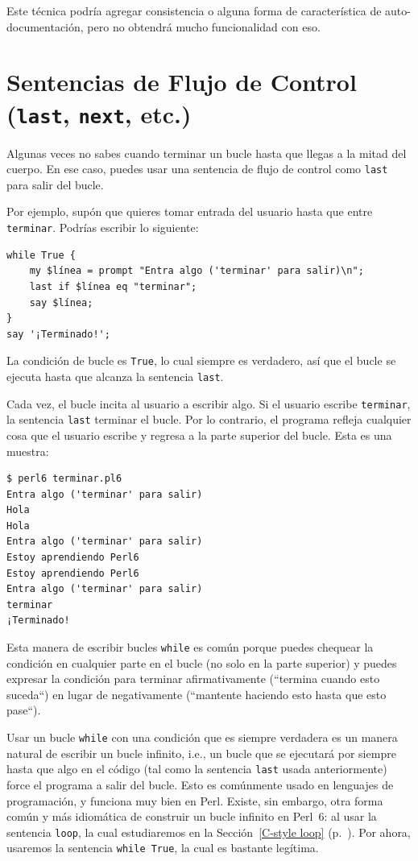 Este técnica podría agregar consistencia o alguna forma
de característica de auto-documentación, pero no obtendrá
mucho funcionalidad con eso.
 

\section{Sentencias de Flujo de Control ({\tt last}, {\tt next}, etc.)}

Algunas veces no sabes cuando terminar un bucle hasta que 
llegas a la mitad del cuerpo. En ese caso, puedes usar una
sentencia de flujo de control como {\tt last} para
salir del bucle.

Por ejemplo, supón que quieres tomar entrada del usuario hasta
que entre {\tt terminar}. Podrías escribir lo siguiente:

\begin{lstlisting}
while True {
    my $línea = prompt "Entra algo ('terminar' para salir)\n";
    last if $línea eq "terminar";
    say $línea;
}
say '¡Terminado!';
\end{lstlisting}
%
La condición de bucle es {\tt True}, lo cual siempre es verdadero,
así que el bucle se ejecuta hasta que alcanza la sentencia
{\tt last}.

Cada vez, el bucle incita al usuario a escribir algo.
Si el usuario escribe {\tt terminar}, la sentencia {\tt last}
terminar el bucle. Por lo contrario, el programa refleja cualquier
cosa que el usuario escribe y regresa a la parte superior del bucle.
Esta es una muestra:

\begin{lstlisting}
$ perl6 terminar.pl6
Entra algo ('terminar' para salir)
Hola
Hola
Entra algo ('terminar' para salir)
Estoy aprendiendo Perl6
Estoy aprendiendo Perl6
Entra algo ('terminar' para salir)
terminar
¡Terminado!
\end{lstlisting}
%
Esta manera de escribir bucles {\tt while} es común 
porque puedes chequear la condición en cualquier parte 
en el bucle (no solo en la parte superior) y puedes expresar
la condición para terminar afirmativamente (``termina cuando esto suceda``)
en lugar de negativamente (``mantente haciendo esto hasta que esto pase``).

Usar un bucle {\tt while} con una condición que es siempre
verdadera es un manera natural de escribir un bucle infinito, i.e.,
un bucle que se ejecutará por siempre hasta que algo en el 
código (tal como la sentencia {\tt last} usada anteriormente)
force el programa a salir del bucle. Esto es comúnmente usado
en lenguajes de programación, y funciona muy bien en Perl. Existe, 
sin embargo, otra forma común y más idiomática de construir
un bucle infinito en Perl~6: al usar la sentencia {\tt loop},
la cual estudiaremos en la Sección~\ref{C-style loop} 
(p.~\pageref{C-style loop}). Por ahora, usaremos la sentencia 
{\tt while True}, la cual es bastante legítima.


